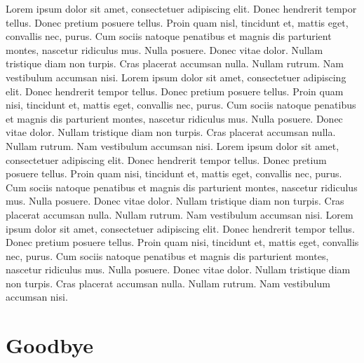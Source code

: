 \documentclass{book}
\begin{document}
Lorem ipsum dolor sit amet, consectetuer adipiscing elit. Donec hendrerit tempor tellus. Donec pretium posuere tellus. Proin quam nisl, tincidunt et, mattis eget, convallis nec, purus. Cum sociis natoque penatibus et magnis dis parturient montes, nascetur ridiculus mus. Nulla posuere. Donec vitae dolor. Nullam tristique diam non turpis. Cras placerat accumsan nulla. Nullam rutrum. Nam vestibulum accumsan nisi.  Lorem ipsum dolor sit amet, consectetuer adipiscing elit. Donec hendrerit tempor tellus. Donec pretium posuere tellus. Proin quam nisi, tincidunt et, mattis eget, convallis nec, purus. Cum sociis natoque penatibus et magnis dis parturient montes, nascetur ridiculus mus. Nulla posuere. Donec vitae dolor. Nullam tristique diam non turpis. Cras placerat accumsan nulla. Nullam rutrum. Nam vestibulum accumsan nisi.  Lorem ipsum dolor sit amet, consectetuer adipiscing elit. Donec hendrerit tempor tellus. Donec pretium posuere tellus. Proin quam nisi, tincidunt et, mattis eget, convallis nec, purus. Cum sociis natoque penatibus et magnis dis parturient montes, nascetur ridiculus mus. Nulla posuere. Donec vitae dolor. Nullam tristique diam non turpis. Cras placerat accumsan nulla. Nullam rutrum. Nam vestibulum accumsan nisi.   Lorem ipsum dolor sit amet, consectetuer adipiscing elit. Donec hendrerit tempor tellus. Donec pretium posuere tellus. Proin quam nisi, tincidunt et, mattis eget, convallis nec, purus. Cum sociis natoque penatibus et magnis dis parturient montes, nascetur ridiculus mus. Nulla posuere. Donec vitae dolor. Nullam tristique diam non turpis. Cras placerat accumsan nulla. Nullam rutrum. Nam vestibulum accumsan nisi.

\chapter{Goodbye}
\end{document}
